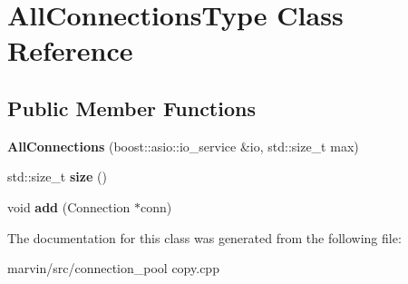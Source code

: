 \hypertarget{class_all_connections_type}{}\section{All\+Connections\+Type Class Reference}
\label{class_all_connections_type}
\subsection*{Public Member Functions}
\begin{DoxyCompactItemize}
\item 
\mbox{\label{class_all_connections_type_a727e2f20b4b6f1b6aee370e976ce2fd8}} 
{\bfseries All\+Connections} (boost\+::asio\+::io\+\_\+service \&io, std\+::size\+\_\+t max)
\item 
\mbox{\label{class_all_connections_type_a4cf046b81e215c256c87253a7fbde576}} 
std\+::size\+\_\+t {\bfseries size} ()
\item 
\mbox{\label{class_all_connections_type_a19220a16787acefaebe95653f13f7a21}} 
void {\bfseries add} (Connection $\ast$conn)
\end{DoxyCompactItemize}


The documentation for this class was generated from the following file\+:\begin{DoxyCompactItemize}
\item 
marvin/src/connection\+\_\+pool copy.\+cpp\end{DoxyCompactItemize}
